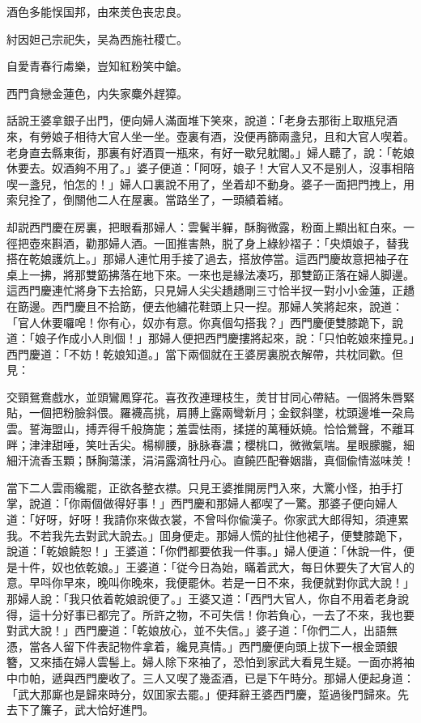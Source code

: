 酒色多能悮国邦，由來羙色丧忠良。

紂因妲己宗祀失，吴為西施社稷亡。

自愛青春行䖏樂，豈知紅粉笑中鎗。

西門貪戀金蓮色，内失家麋外趕獐。

話說王婆拿銀子出門，便向婦人滿面堆下笑來，說道：「老身去那街上取瓶兒酒來，有勞娘子相待大官人坐一坐。壺裏有酒，没便再篩兩盞兒，且和大官人喫着。老身直去縣東街，那裏有好酒買一瓶來，有好一歇兒躭閣。」婦人聽了，說：「乾娘休要去。奴酒夠不用了。」婆子便道：「阿呀，娘子！大官人又不是别人，沒事相陪喫一盞兒，怕怎的！」婦人口裏說不用了，坐着却不動身。婆子一面把門拽上，用索兒拴了，倒關他二人在屋裏。當路坐了，一頭績着緒。

却説西門慶在房裏，把眼看那婦人：雲鬢半軃，酥胸微露，粉面上顯出紅白來。一徑把壺來斟酒，勸那婦人酒。一囬推害熱，脱了身上綠紗褶子：「央煩娘子，替我搭在乾娘護炕上。」那婦人連忙用手接了過去，搭放停當。這西門慶故意把袖子在桌上一拂，將那雙筯拂落在地下來。一來也是緣法凑巧，那雙筯正落在婦人脚邊。這西門慶連忙將身下去拾筯，只見婦人尖尖趫趫剛三寸恰半扠一對小小金蓮，正趫在筯邊。西門慶且不拾筯，便去他繡花鞋頭上只一揑。那婦人笑將起來，說道：「官人休要囉唣！你有心，奴亦有意。你真個勾搭我？」西門慶便雙膝跪下，說道：「娘子作成小人則個！」那婦人便把西門慶摟將起來，說：「只怕乾娘來撞見。」西門慶道：「不妨！乾娘知道。」當下兩個就在王婆房裏脱衣解帶，共枕同歡。但見：

交頸鴛鴦戲水，並頭鸞鳳穿花。喜孜孜連理枝生，羙甘甘同心帶結。一個將朱唇緊貼，一個把粉臉斜偎。羅襪高挑，肩膊上露兩彎新月；金釵斜墜，枕頭邊堆一朶烏雲。誓海盟山，搏弄得千般旖旎；羞雲怯雨，揉搓的萬種妖嬈。恰恰鶯聲，不離耳畔；津津甜唾，笑吐舌尖。楊柳腰，脉脉春濃；櫻桃口，微微氣喘。星眼朦朧，細細汗流香玉顆；酥胸蕩漾，涓涓露滴牡丹心。直饒匹配眷姻諧，真個偸情滋味羙！

當下二人雲雨纔罷，正欲各整衣襟。只見王婆推開房門入來，大驚小怪，拍手打掌，說道：「你兩個做得好事！」西門慶和那婦人都喫了一驚。那婆子便向婦人道：「好呀，好呀！我請你來做衣裳，不曾呌你偸漢子。你家武大郎得知，須連累我。不若我先去對武大說去。」囬身便走。那婦人慌的扯住他裙子，便雙膝跪下，說道：「乾娘饒恕！」王婆道：「你們都要依我一件事。」婦人便道：「休說一件，便是十件，奴也依乾娘。」王婆道：「従今日為始，瞞着武大，每日休要失了大官人的意。早呌你早來，晚叫你晚來，我便罷休。若是一日不來，我便就對你武大說！」那婦人說：「我只依着乾娘說便了。」王婆又道：「西門大官人，你自不用着老身說得，這十分好事已都完了。所許之物，不可失信！你若負心，一去了不來，我也要對武大說！」西門慶道：「乾娘放心，並不失信。」婆子道：「你們二人，出語無憑，當各人留下件表記物件拿着，纔見真情。」西門慶便向頭上拔下一根金頭銀簪，又來插在婦人雲髻上。婦人除下來袖了，恐怕到家武大看見生疑。一面亦將袖中巾帕，遞與西門慶收了。三人又喫了幾盃酒，已是下午時分。那婦人便起身道：「武大那廝也是歸來時分，奴囬家去罷。」便拜辭王婆西門慶，踅過後門歸來。先去下了簾子，武大恰好進門。

